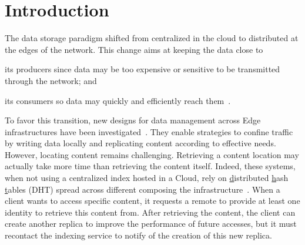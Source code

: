 \section{Introduction}

The data storage paradigm shifted from centralized in
the cloud to distributed at the edges of the network. 
This change aims at keeping the data close to
\begin{inparaenum}[(i)]
\item its producers since data may be too expensive or sensitive to be
  transmitted through the network; and
\item its consumers so data may quickly and efficiently reach
  them~\cite{cachier,foggy_cache,shi2016edge}.
\end{inparaenum}
%
To favor this transition, new designs for data management across Edge
infrastructures have been investigated~\cite{confais2017object,confais2017performance,fogstore,hasenburg2020towards}.  They
enable strategies to confine traffic by writing data locally and
replicating content according to effective needs. However, locating
content remains challenging. Retrieving a content location may
actually take more time than retrieving the content itself.
%
Indeed, these systems, when not using a centralized index hosted in a
Cloud, rely on \underline{d}istributed \underline{h}ash
\underline{t}ables (DHT) spread across different \processes composing
the infrastructure~\cite{maymounkov2002kademlia}. When a client wants
to access specific content, it requests a remote \process to provide
at least one \process identity to retrieve this content from. After
retrieving the content, the client can create another replica to
improve the performance of future accesses, but it must recontact the
indexing service to notify of the creation of this new replica.
%

